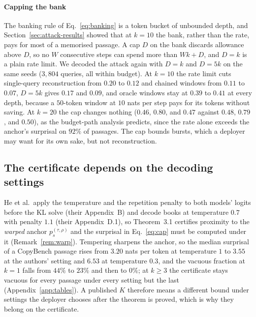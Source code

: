 \paragraph{Capping the bank}
The banking rule of Eq.~\eqref{eq:banking} is a token bucket of unbounded depth, and Section~\ref{sec:attack-results} showed that at $k=10$ the bank, rather than the rate, pays for most of a memorised passage. A cap $D$ on the bank discards allowance above $D$, so no $W$ consecutive steps can spend more than $Wk + D$, and $D = k$ is a plain rate limit. We decoded the attack again with $D = k$ and $D = 5k$ on the same seeds ($3{,}804$ queries, all within budget). At $k=10$ the rate limit cuts single-query reconstruction from $0.20$ to $0.12$ and chained windows from $0.11$ to $0.07$, $D = 5k$ gives $0.17$ and $0.09$, and oracle windows stay at $0.39$ to $0.41$ at every depth, because a $50$-token window at $10$ nats per step pays for its tokens without saving. At $k=20$ the cap changes nothing ($0.46$, $0.80$, and $0.47$ against $0.48$, $0.79$, and $0.50$), as the budget-path analysis predicts, since the rate alone exceeds the anchor's surprisal on $92\%$ of passages. The cap bounds bursts, which a deployer may want for its own sake, but not reconstruction.




\subsection{The certificate depends on the decoding settings}\label{sec:warped}
He et al.\ apply the temperature and the repetition penalty to both models' logits before the KL solve (their Appendix~B) and decode books at temperature $0.7$ with penalty $1.1$ (their Appendix~D.1), so Theorem~3.1 certifies proximity to the \emph{warped} anchor $p_s^{(\tau,\rho)}$ and the surprisal in Eq.~\eqref{eq:cap} must be computed under it (Remark~\ref{rem:warp}). Tempering sharpens the anchor, so the median surprisal of a CopyBench passage rises from $3.20$ nats per token at temperature $1$ to $3.55$ at the authors' setting and $6.53$ at temperature $0.3$, and the vacuous fraction at $k=1$ falls from $44\%$ to $23\%$ and then to $0\%$; at $k \ge 3$ the certificate stays vacuous for every passage under every setting but the last (Appendix~\ref{app:tables}). A published $K$ therefore means a different bound under settings the deployer chooses after the theorem is proved, which is why they belong on the certificate.


